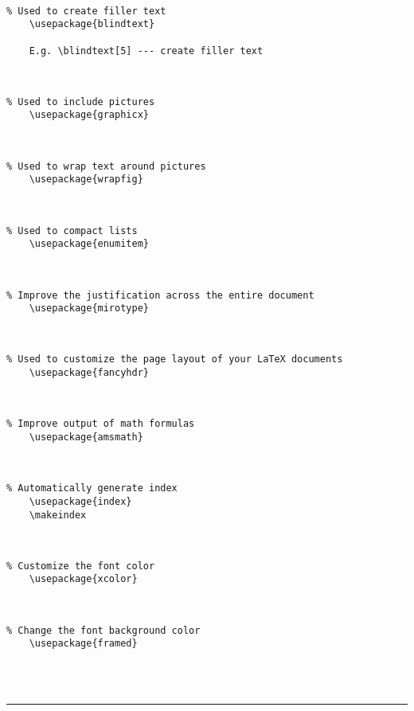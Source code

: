 \documentclass[a4paper,12pt,titlepage]{article}
\begin{document}
~\\
\begin{lstlisting}
% Used to create filler text
	\usepackage{blindtext}
	
	E.g. \blindtext[5] --- create filler text
\end{lstlisting}
~\\
\begin{lstlisting}
% Used to include pictures
	\usepackage{graphicx}
\end{lstlisting}
~\\
\begin{lstlisting}
% Used to wrap text around pictures
	\usepackage{wrapfig}
\end{lstlisting}
~\\
\begin{lstlisting}
% Used to compact lists
	\usepackage{enumitem}
\end{lstlisting}
~\\
\begin{lstlisting}
% Improve the justification across the entire document
	\usepackage{mirotype}
\end{lstlisting}
~\\
\begin{lstlisting}
% Used to customize the page layout of your LaTeX documents
	\usepackage{fancyhdr}
\end{lstlisting}
~\\
\begin{lstlisting}
% Improve output of math formulas
	\usepackage{amsmath}
\end{lstlisting}
~\\
\begin{lstlisting}
% Automatically generate index
	\usepackage{index}
	\makeindex
\end{lstlisting}
~\\
\begin{lstlisting}
% Customize the font color
	\usepackage{xcolor}
\end{lstlisting}
~\\
\begin{lstlisting}
% Change the font background color
	\usepackage{framed}
\end{lstlisting}
~\\
\\
\rule{\linewidth}{0.1mm}







\end{document}
